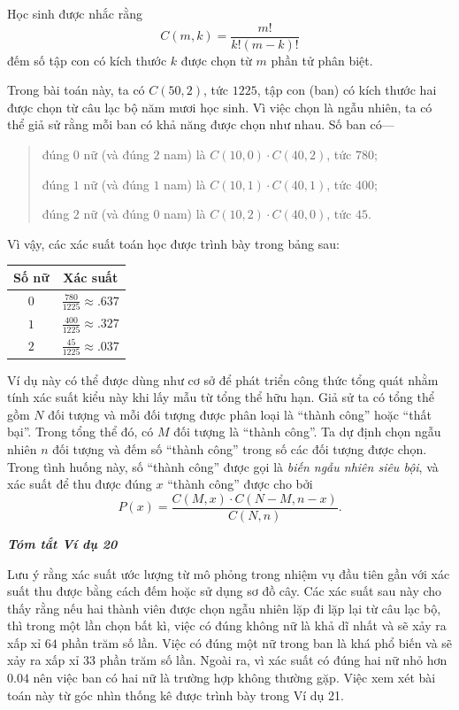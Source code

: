 {    Học sinh được nhắc rằng
    $$
      C(m,k)=\frac{m!}{k!(m-k)!}
    $$
    đếm số tập con có kích thước $k$ được chọn từ $m$ phần tử phân biệt.

    Trong bài toán này, ta có $C(50,2)$, tức $1225$, tập con (ban) có kích thước hai được chọn từ câu lạc bộ năm mươi học sinh. Vì việc chọn là ngẫu nhiên, ta có thể giả sử rằng mỗi ban có khả năng được chọn như nhau. Số ban có---\vspace{\baselineskip}
    \begin{quote}
      đúng $0$  nữ (và đúng $2$  nam) là $C(10,0)\cdot C(40,2)$, tức $780$;

      đúng $1$ nữ (và đúng $1$ nam) là $C(10,1)\cdot C(40,1)$, tức $400$;

      đúng $2$ nữ (và đúng $0$ nam) là $C(10,2)\cdot C(40,0)$, tức $45$.
    \end{quote}

    Vì vậy, các xác suất toán học được trình bày trong bảng sau:

    \begin{center}
    \begin{tabular}{|c|c|}
    \hline
    Số nữ & Xác suất \\
    \hline
    $0$ & $\frac{780}{1225}\approx .637$ \\
    \hline
    $1$ & $\frac{400}{1225}\approx .327$ \\
    \hline
    $2$ & $\frac{45}{1225}\approx .037$ \\
    \hline
    \end{tabular}
    \end{center}

    Ví dụ này có thể được dùng như cơ sở để phát triển công thức tổng quát nhằm tính xác suất kiểu này khi lấy mẫu từ tổng thể hữu hạn. Giả sử ta có tổng thể gồm $N$ đối tượng và mỗi đối tượng được phân loại là ``thành công'' hoặc ``thất bại''. Trong tổng thể đó, có $M$ đối tượng là ``thành công''. Ta dự định chọn ngẫu nhiên $n$ đối tượng và đếm số ``thành công'' trong số các đối tượng được chọn. Trong tình huống này, số ``thành công'' được gọi là \emph{biến ngẫu nhiên siêu bội}, và xác suất để thu được đúng $x$ ``thành công'' được cho bởi\vspace{\baselineskip}
    $$
      P(x)=\frac{C(M,x)\cdot C(N-M,n-x)}{C(N,n)}.
    $$

    \textbf{\emph{Tóm tắt Ví dụ 20}}

    Lưu ý rằng xác suất ước lượng từ mô phỏng trong nhiệm vụ đầu tiên gần với xác suất thu được bằng cách đếm hoặc sử dụng sơ đồ cây. Các xác suất sau này cho thấy rằng nếu hai thành viên được chọn ngẫu nhiên lặp đi lặp lại từ câu lạc bộ, thì trong một lần chọn bất kì, việc có đúng không nữ là khả dĩ nhất và sẽ xảy ra xấp xỉ $64$ phần trăm số lần. Việc có đúng một nữ trong ban là khá phổ biến và sẽ xảy ra xấp xỉ $33$ phần trăm số lần. Ngoài ra, vì xác suất có đúng hai nữ nhỏ hơn $0.04$ nên việc ban có hai nữ là trường hợp không thường gặp. Việc xem xét bài toán này từ góc nhìn thống kê được trình bày trong Ví dụ 21.\vspace{3\baselineskip}

}
